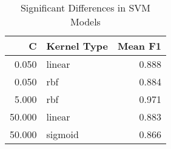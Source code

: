 \begin{table}
\centering
\caption{Significant Differences in SVM Models}
\label{tab:svm_significant_pairs_hepatitis}
\begin{tabular}{rlr}
\toprule
C & Kernel Type & Mean F1 \\
\midrule
0.050 & linear & 0.888 \\
0.050 & rbf & 0.884 \\
5.000 & rbf & 0.971 \\
50.000 & linear & 0.883 \\
50.000 & sigmoid & 0.866 \\
\bottomrule
\end{tabular}
\end{table}

